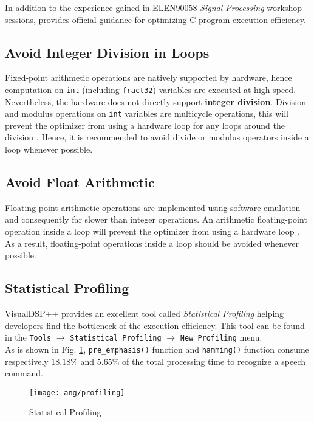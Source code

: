 In addition to the experience gained in ELEN90058 \textit{Signal Processing} workshop sessions, \cite{TuningCSourceCode} provides official guidance for optimizing C program execution efficiency.

\subsection{Avoid Integer Division in Loops}
Fixed-point arithmetic operations are natively supported by hardware, hence computation on \texttt{int} (including \texttt{fract32}) variables are executed at high speed. Nevertheless, the hardware does not directly support \textbf{integer division}. Division and modulus operations on \texttt{int} variables are multicycle operations, this will prevent the optimizer from using a hardware loop for any loops around the division \cite{TuningCSourceCode}. Hence, it is recommended to avoid divide or modulus operators inside a loop whenever possible.

\subsection{Avoid Float Arithmetic}
Floating-point arithmetic operations are implemented using software emulation and consequently far slower than integer operations. An arithmetic floating-point operation inside a loop will prevent the optimizer from using a hardware loop \cite{TuningCSourceCode}. As a result, floating-point operations inside a loop should be avoided whenever possible.

\subsection{Statistical Profiling}

VisualDSP++ provides an excellent tool called \textit{Statistical Profiling} helping developers find the bottleneck of the execution efficiency. This tool can be found in the \texttt{Tools} $\to$ \texttt{Statistical Profiling} $\to$ \texttt{New Profiling} menu.\\

As is shown in Fig. \ref{profiler}, \texttt{pre\_emphasis()} function and \texttt{hamming()} function consume respectively $18.18\%$ and $5.65\%$ of the total processing time to recognize a speech command.

\begin{figure}[H]
\centering
\texttt{[image: ang/profiling]}
\caption{Statistical Profiling}
\label{profiler}
\end{figure}

